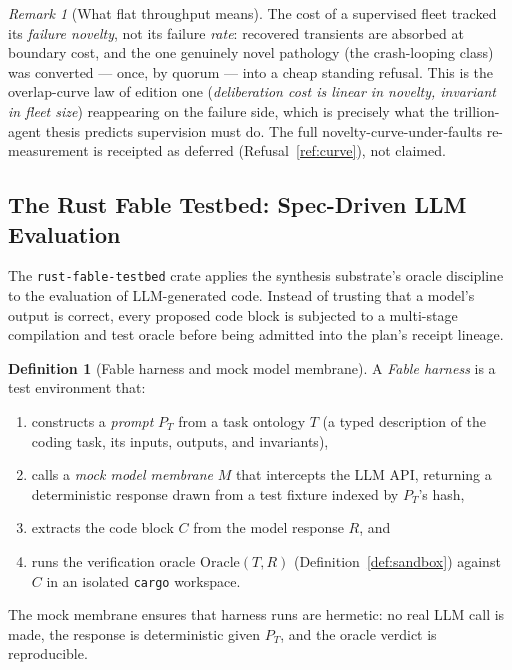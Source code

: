 \documentclass[11pt,a4paper]{article}
\theoremstyle{definition}
\newtheorem{definition}[theorem]{Definition}
\theoremstyle{remark}
\newtheorem{remark}[theorem]{Remark}
\newcommand{\code}[1]{\texttt{#1}}        %
\begin{document}
\begin{remark}[What flat throughput means]
The cost of a supervised fleet tracked its \emph{failure novelty}, not its
failure \emph{rate}: recovered transients are absorbed at boundary cost,
and the one genuinely novel pathology (the crash-looping class) was
converted --- once, by quorum --- into a cheap standing refusal. This is
the overlap-curve law of edition one (\emph{deliberation cost is linear in
novelty, invariant in fleet size}) reappearing on the failure side, which
is precisely what the trillion-agent thesis predicts supervision must do.
The full novelty-curve-under-faults re-measurement is receipted as
deferred (Refusal~\ref{ref:curve}), not claimed.
\end{remark}

\subsection{The Rust Fable Testbed: Spec-Driven LLM Evaluation}

The \code{rust-fable-testbed} crate applies the synthesis substrate's oracle discipline to
the evaluation of LLM-generated code. Instead of trusting that a model's output is correct,
every proposed code block is subjected to a multi-stage compilation and test oracle before
being admitted into the plan's receipt lineage.

\begin{definition}[Fable harness and mock model membrane]\label{def:fable}
A \emph{Fable harness} is a test environment that:
\begin{enumerate}[label=(\arabic*)]
\item constructs a \emph{prompt} $P_T$ from a task ontology $T$ (a typed description of
      the coding task, its inputs, outputs, and invariants),
\item calls a \emph{mock model membrane} $M$ that intercepts the LLM API, returning a
      deterministic response drawn from a test fixture indexed by $P_T$'s hash,
\item extracts the code block $C$ from the model response $R$, and
\item runs the verification oracle $\mathrm{Oracle}(T,R)$ (Definition~\ref{def:sandbox})
      against $C$ in an isolated \code{cargo} workspace.
\end{enumerate}
The mock membrane ensures that harness runs are hermetic: no real LLM call is made, the
response is deterministic given $P_T$, and the oracle verdict is reproducible.
\end{definition}
\end{document}
